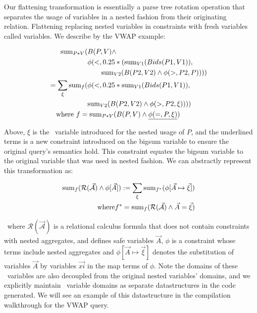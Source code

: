 Our flattening transformation is essentially a parse tree rotation operation
that separates the usage of variables in a nested fashion from their originating
relation. Flattening replacing nested variables in constraints with fresh
variables called \textit{\bigsum} variables. 
We describe by the VWAP example:

\begin{align*}
  \mathrm{sum}_{P*V}( & B(P,V) \wedge \\
& \phi(<, 0.25*(\mathrm{sum}_{V1}(Bids(P1,V1)),
\\
& \qquad \mathrm{sum}_{V2}(B(P2,V2) \wedge \phi(>, P2, P)))) \\
= \sum_{\xi} \mathrm{sum}_{f}( & \phi(<, 0.25*\mathrm{sum}_{V1}(Bids(P1,V1)), \\
& \mathrm{sum}_{V2}(B(P2,V2) \wedge \phi(>, P2, \xi)))) \\
\mbox{ where } f = & \; \mathrm{sum}_{P*V}(B(P,V) \wedge \underline{\phi(=,P,\xi)})
\end{align*}

Above, $\xi$ is the \bigsum\ variable introduced for the nested usage of $P$,
and the underlined terms is a new constraint introduced on the bigsum variable
to ensure the original query's semantics hold. This constraint equates the
bigsum variable to the original variable that was used in nested fashion. We can
abstractly represent this transformation as:

\begin{align*}
\mathrm{sum}_{f}(\mathcal{R(\vec{A})} \wedge \phi[\vec{A}]) :=
\sum_{\xi} \mathrm{sum}_{f^*}(\phi[\vec{A} \mapsto \vec{\xi}]) \\
 \mbox{ where} f^* = \mathrm{sum}_{f}(\mathcal{R(\vec{A})} \wedge \vec{A} = \vec{\xi})
\end{align*}

\noindent~where $\mathcal{R(\vec{A})}$ is a relational calculus formula that
does not contain constraints with nested aggregates, and defines safe variables
$\vec{A}$, $\phi$ is a constraint whose terms include nested aggregates and
$\phi[\vec{A} \mapsto \vec{\xi}]$ denotes the substitution of variables
$\vec{A}$ by variables $\vec{xi}$ in the map terms of $\phi$.
Note the domains of these \bigsum\ variables are also decoupled from the
original nested variables' domains, and we explicitly maintain \bigsum\ variable
domains as separate datastructures in the code generated. We will see an example
of this datastructure in the compilation walkthrough for the VWAP query.


